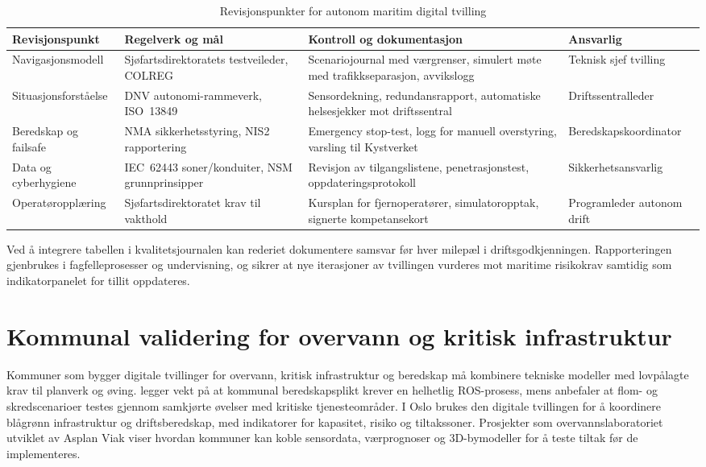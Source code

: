 \begin{table}[ht]
    \centering
    \caption{Revisjonspunkter for autonom maritim digital tvilling}
    \label{tab:maritim-tilsyn}
    \begin{tabular}{|p{3.1cm}|p{4.7cm}|p{4.7cm}|p{2.8cm}|}
        \hline
        \textbf{Revisjonspunkt} & \textbf{Regelverk og mål} & \textbf{Kontroll og dokumentasjon} & \textbf{Ansvarlig} \\
        \hline
        Navigasjonsmodell & Sjøfartsdirektoratets testveileder, COLREG & Scenariojournal med værgrenser, simulert møte med trafikkseparasjon, avvikslogg & Teknisk sjef tvilling \\
        \hline
        Situasjonsforståelse & DNV autonomi-rammeverk, ISO~13849 & Sensordekning, redundansrapport, automatiske helsesjekker mot driftssentral & Driftssentralleder \\
        \hline
        Beredskap og failsafe & NMA sikkerhetsstyring, NIS2 rapportering & Emergency stop-test, logg for manuell overstyring, varsling til Kystverket & Beredskapskoordinator \\
        \hline
        Data og cyberhygiene & IEC~62443 soner/konduiter, NSM grunnprinsipper & Revisjon av tilgangslistene, penetrasjonstest, oppdateringsprotokoll & Sikkerhetsansvarlig \\
        \hline
        Operatøropplæring & Sjøfartsdirektoratet krav til vakthold & Kursplan for fjernoperatører, simulatoropptak, signerte kompetansekort & Programleder autonom drift \\
        \hline
    \end{tabular}
\end{table}

Ved å integrere tabellen i kvalitetsjournalen kan rederiet dokumentere samsvar før hver milepæl i driftsgodkjenningen. Rapporteringen gjenbrukes i fagfelleprosesser og undervisning, og sikrer at nye iterasjoner av tvillingen vurderes mot maritime risikokrav samtidig som indikatorpanelet for tillit oppdateres.

\section{Kommunal validering for overvann og kritisk infrastruktur}
Kommuner som bygger digitale tvillinger for overvann, kritisk infrastruktur og beredskap må kombinere tekniske modeller med lovpålagte krav til planverk og øving. \citet{dsb2022beredskap} legger vekt på at kommunal beredskapsplikt krever en helhetlig ROS-prosess, mens \citet{nve2022kommunal} anbefaler at flom- og skredscenarioer testes gjennom samkjørte øvelser med kritiske tjenesteområder. I Oslo brukes den digitale tvillingen for å koordinere blågrønn infrastruktur og driftsberedskap, med indikatorer for kapasitet, risiko og tiltakssoner.\citep{oslo2023overvann} Prosjekter som overvannslaboratoriet utviklet av Asplan Viak viser hvordan kommuner kan koble sensordata, værprognoser og 3D-bymodeller for å teste tiltak før de implementeres.\citep{asplan2023overvannslab}

